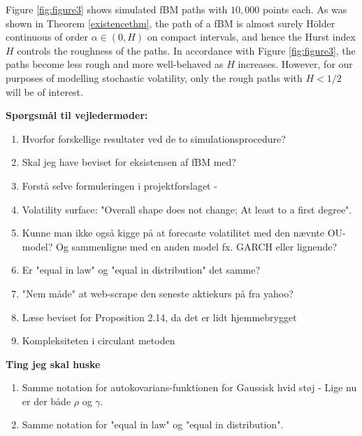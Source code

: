 Figure \ref{fig:figure3} shows simulated fBM paths with $10,000$ points each. As was shown in Theorem \ref{existencethm}, the path of a fBM is almost surely Hölder continuous of order $\alpha\in(0,H)$ on compact intervals, and hence the Hurst index $H$ controls the roughness of the paths. In accordance with Figure \ref{fig:figure3}, the paths become less rough and more well-behaved as $H$ increases. However, for our purposes of modelling stochastic volatility, only the rough paths with $H<1/2$ will be of interest.

\newpage
\textbf{Spørgsmål til vejledermøder:}
\begin{enumerate}
    \item Hvorfor forskellige resultater ved de to simulationsprocedure?
    \item Skal jeg have beviset for eksistensen af fBM med? 
    \item Forstå selve formuleringen i projektforslaget -
    \item Volatility surface: "Overall shape does not change; At least to a first degree".
    \item Kunne man ikke også kigge på at forecaste volatilitet med den nævnte OU-model? Og sammenligne med en anden model fx. GARCH eller lignende? 
    \item Er "equal in law" og "equal in distribution" det samme?
    \item "Nem måde" at web-scrape den seneste aktiekurs på fra yahoo?
    \item Læse beviset for Proposition 2.14, da det er lidt hjemmebrygget
    \item Kompleksiteten i circulant metoden
\end{enumerate}
\textbf{Ting jeg skal huske}
\begin{enumerate}
    \item Samme notation for autokovarians-funktionen for Gaussisk hvid støj - Lige nu er der både $\rho$ og $\gamma$.
    \item Samme notation for "equal in law" og "equal in distribution".
\end{enumerate}
